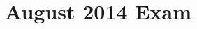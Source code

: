 \documentclass[11pt]{article}
\theoremstyle{definition}
\numberwithin{equation}{subsection}
\begin{document}
\newpage
\section{August 2014 Exam}






\newpage


\end{document}
